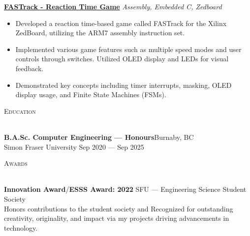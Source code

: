 \documentclass[a4paper]{article}
\newcommand{\lineunder} {
    \vspace*{-8pt} \\
    \hspace*{-18pt} \hrulefill\\
}
\newcommand{\header} [1] {
    {\hspace*{-18pt}\vspace*{6pt} \textsc{#1}}
    \vspace*{-6pt} \lineunder{}
}
\begin{document}
\href{https://github.com/SatireSage/FASTrack}{\textbf{FASTrack - Reaction Time Game}} {\sl Assembly, Embedded C, Zedboard\/}
\vspace{-2mm}
\begin{itemize} \itemsep-3pt
    \item Developed a reaction time-based game called FASTrack for the Xilinx ZedBoard, utilizing the ARM7 assembly instruction set.
    \item Implemented various game features such as multiple speed modes and user controls through switches. Utilized OLED display and LEDs for visual feedback.
    \item Demonstrated key concepts including timer interrupts, masking, OLED display usage, and Finite State Machines (FSMs).
\end{itemize}

\header{Education}
\textbf{B.A.Sc. Computer Engineering --- Honours}\hfill Burnaby, BC\\
Simon Fraser University \hfill Sep 2020 --- Sep 2025\\
\vspace{1mm}

\header{Awards}
\textbf{Innovation Award}/\textbf{ESSS Award: 2022} \hfill SFU --- Engineering Science Student Society\\
Honors contributions to the student society and Recognized for outstanding creativity, originality, and impact via my projects driving advancements in technology.\\
\vspace*{1mm}
\end{document}
